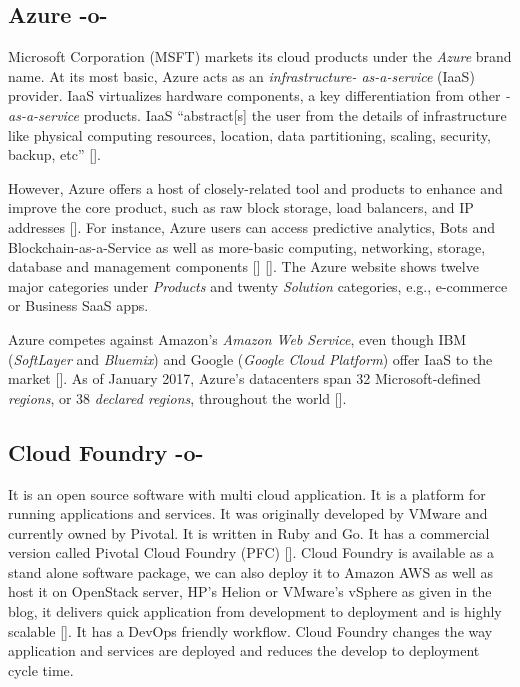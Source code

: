 \subsection{Azure -o-}

Microsoft Corporation (MSFT) markets its cloud products under the
\textit{Azure} brand name. At its most basic, Azure acts as an
\textit{infrastructure- as-a-service} (IaaS) provider.  IaaS virtualizes
hardware components, a key differentiation from other \textit{-as-a-service}
products. IaaS ``abstract[s] the user from the details of
infrastructure like physical computing resources, location, data
partitioning, scaling, security, backup,
etc'' [\cite{www-wikipedia-cloud}].

However, Azure offers a host of closely-related tool and products to
enhance and improve the core product, such as raw block storage, load
balancers, and IP addresses [\cite{www-azure-msft}]. For instance, Azure
users can access predictive analytics, Bots and
Blockchain-as-a-Service as well as more-basic computing, networking,
storage, database and management
components [\cite{www-sec-edgar-msft}] [\cite{www-azure-msft}].  The Azure
website shows twelve major categories under \textit{Products} and twenty
\textit{Solution} categories, e.g., e-commerce or Business SaaS apps.

Azure competes against Amazon's \textit{Amazon Web Service}, even though IBM
(\textit{SoftLayer} and \textit{Bluemix}) and Google (\textit{Google Cloud Platform})
offer IaaS to the market [\cite{www-aws-amzn, www-softlayer-ibm,
  www-bluemix-ibm,www-cloud-google}].  As of January 2017, Azure's
datacenters span 32 Microsoft-defined \textit{regions}, or 38 \textit{declared
regions}, throughout the world [\cite{www-azure-msft}].



\subsection{Cloud Foundry -o-}

It is an open source software with multi cloud application. It is a
platform for running applications and services. It was originally
developed by VMware and currently owned by Pivotal. It is written in
Ruby and Go. It has a commercial version called Pivotal Cloud Foundry
(PFC) [\cite{www-cloudfoundry-book}]. Cloud Foundry is available as a
stand alone software package, we can also deploy it to Amazon AWS as
well as host it on OpenStack server, HP's Helion or VMware's vSphere
as given in the blog, it delivers quick application from development
to deployment and is highly scalable [\cite{www-cloudfoundry-blog}]. It
has a DevOps friendly workflow.  Cloud Foundry changes the way
application and services are deployed and reduces the develop to
deployment cycle time.



